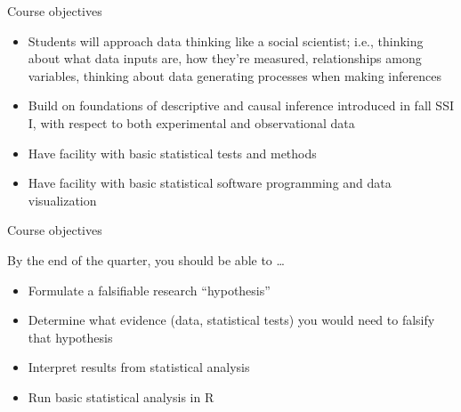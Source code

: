 \documentclass[xcolor={dvipsnames}]{beamer}
\begin{document}
\begin{frame}{Course objectives}
\pause
\begin{itemize}
\item Students will approach data thinking like a social scientist; i.e., thinking about what data inputs are, how they’re measured, relationships among variables, thinking about data generating processes when making inferences\pause
\item Build on foundations of descriptive and causal inference introduced in fall SSI I, with respect to both experimental and observational data \pause
\item Have facility with basic statistical tests and methods \pause
\item Have facility with basic statistical software programming and data visualization 
\end{itemize}

\end{frame}



\begin{frame}{Course objectives}

By the end of the quarter, you should be able to \dots\pause
\begin{itemize}
\item Formulate a falsifiable research ``hypothesis'' \pause
\item Determine what evidence (data, statistical tests) you would need to falsify that hypothesis \pause
\item Interpret results from statistical analysis \pause
\item Run basic statistical analysis in R
\end{itemize}

\end{frame}


\end{document}
